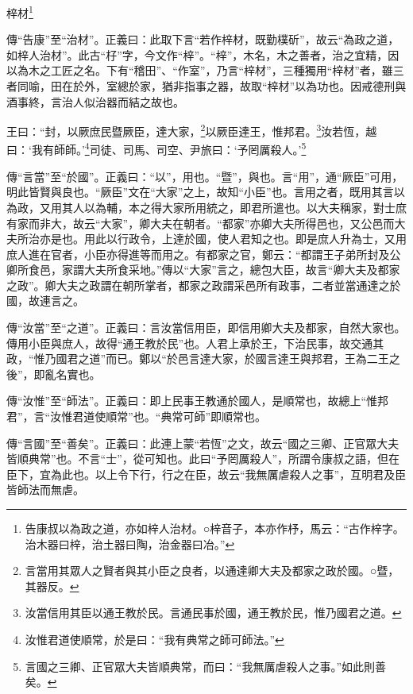 梓材\footnote{告康叔以為政之道，亦如梓人治材。○梓音子，本亦作杼，馬云：“古作梓字。治木器曰梓，治土器曰陶，治金器曰冶。”}

{\noindent\shu{}\fzkt 傳“告康”至“治材”。正義曰：此取下言“若作梓材，既勤樸斫”，故云“為政之道，如梓人治材”。此古“杍”字，今文作“梓”。“梓”，木名，木之善者，治之宜精，因以為木之工匠之名。下有“稽田”、“作室”，乃言“梓材”，三種獨用“梓材”者，雖三者同喻，田在於外，室總於家，猶非指事之器，故取“梓材”以為功也。因戒德刑與酒事終，言治人似治器而結之故也。 \par}

王曰：“封，以厥庶民暨厥臣，達大家，\footnote{言當用其眾人之賢者與其小臣之良者，以通達卿大夫及都家之政於國。○暨，其器反。}以厥臣達王，惟邦君。\footnote{汝當信用其臣以通王教於民。言通民事於國，通王教於民，惟乃國君之道。}汝若恆，越曰：‘我有師師。’\footnote{汝惟君道使順常，於是曰：“我有典常之師可師法。”}司徒、司馬、司空、尹旅曰：‘予罔厲殺人。’\footnote{言國之三卿、正官眾大夫皆順典常，而曰：“我無厲虐殺人之事。”如此則善矣。}


{\noindent\zhuan{}\fzbyks 傳“言當”至“於國”。正義曰：“以”，用也。“暨”，與也。言“用”，通“厥臣”可用，明此皆賢與良也。“厥臣”文在“大家”之上，故知“小臣”也。言用之者，既用其言以為政，又用其人以為輔，本之得大家所用統之，即君所遣也。以大夫稱家，對士庶有家而非大，故云“大家”，卿大夫在朝者。“都家”亦卿大夫所得邑也，又公邑而大夫所治亦是也。用此以行政令，上達於國，使人君知之也。即是庶人升為士，又用庶人進在官者，小臣亦得進等而用之。有都家之官，鄭云：“都謂王子弟所封及公卿所食邑，家謂大夫所食采地。”傳以“大家”言之，總包大臣，故言“卿大夫及都家之政”。卿大夫之政謂在朝所掌者，都家之政謂采邑所有政事，二者並當通達之於國，故連言之。 \par}

{\noindent\zhuan{}\fzbyks 傳“汝當”至“之道”。正義曰：言汝當信用臣，即信用卿大夫及都家，自然大家也。傳用小臣與庶人，故得“通王教於民”也。人君上承於王，下治民事，故交通其政，“惟乃國君之道”而已。鄭以“於邑言達大家，於國言達王與邦君，王為二王之後”，即亂名實也。 \par}

{\noindent\zhuan{}\fzbyks 傳“汝惟”至“師法”。正義曰：即上民事王教通於國人，是順常也，故總上“惟邦君”，言“汝惟君道使順常”也。“典常可師”即順常也。 \par}

{\noindent\zhuan{}\fzbyks 傳“言國”至“善矣”。正義曰：此連上蒙“若恆”之文，故云“國之三卿、正官眾大夫皆順典常”也。不言“士”，從可知也。此曰“予罔厲殺人”，所謂令康叔之語，但在臣下，宜為此也。以上令下行，行之在臣，故云“我無厲虐殺人之事”，互明君及臣皆師法而無虐。 \par}

